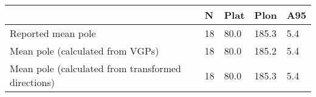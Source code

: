 \begin{tabular}{lllll}
\toprule
{} &   N &  Plat &   Plon &  A95 \\
\midrule
Reported mean pole                                 &  18 &  80.0 &  185.3 &  5.4 \\
Mean pole (calculated from VGPs)                   &  18 &  80.0 &  185.2 &  5.4 \\
Mean pole (calculated from transformed directions) &  18 &  80.0 &  185.3 &  5.4 \\
\bottomrule
\end{tabular}
